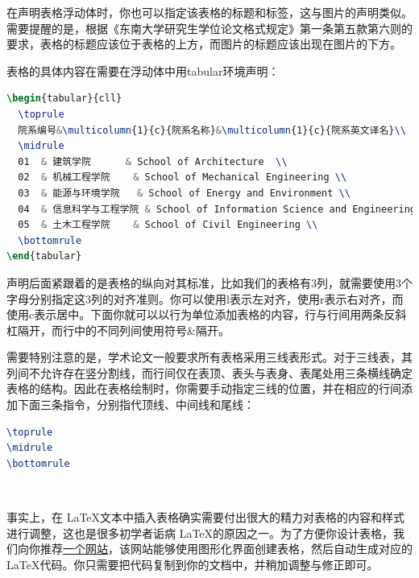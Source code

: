 \noindent 在声明表格浮动体时，你也可以指定该表格的标题和标签，这与图片的声明类似。需要提醒的是，根据《东南大学研究生学位论文格式规定》\cite{seugs2015rule}第一条第五款第六则的要求，表格的标题应该位于表格的上方，而图片的标题应该出现在图片的下方。

表格的具体内容在需要在浮动体中用{\codefont tabular}环境声明：

\begin{tcolorbox}
\begin{lstlisting}[language=TeX]
\begin{tabular}{cll}
  \toprule
  院系编号&\multicolumn{1}{c}{院系名称}&\multicolumn{1}{c}{院系英文译名}\\
  \midrule
  01  & 建筑学院      & School of Architecture  \\
  02  & 机械工程学院    & School of Mechanical Engineering \\
  03  & 能源与环境学院   & School of Energy and Environment \\
  04  & 信息科学与工程学院 & School of Information Science and Engineering \\
  05  & 土木工程学院    & School of Civil Engineering \\
  \bottomrule
\end{tabular}
\end{lstlisting}
\end{tcolorbox}

声明后面紧跟着的是表格的纵向对其标准，比如我们的表格有3列，就需要使用3个字母分别指定这3列的对齐准则。你可以使用{\codefont l}表示左对齐，使用{\codefont r}表示右对齐，而使用{\codefont c}表示居中。下面你就可以以行为单位添加表格的内容，行与行间用两条反斜杠隔开，而行中的不同列间使用符号\&隔开。

需要特别注意的是，学术论文一般要求所有表格采用三线表形式。对于三线表，其列间不允许存在竖分割线，而行间仅在表顶、表头与表身、表尾处用三条横线确定表格的结构。因此在表格绘制时，你需要手动指定三线的位置，并在相应的行间添加下面三条指令，分别指代顶线、中间线和尾线：

\begin{tcolorbox}
\begin{lstlisting}[language=TeX]
\toprule
\midrule
\bottomrule
\end{lstlisting}
\end{tcolorbox}

~

事实上，在 \LaTeX 文本中插入表格确实需要付出很大的精力对表格的内容和样式进行调整，这也是很多初学者诟病 \LaTeX 的原因之一。为了方便你设计表格，我们向你推荐\href{http://www.tablesgenerator.com/}{一个网站}，该网站能够使用图形化界面创建表格，然后自动生成对应的 \LaTeX 代码。你只需要把代码复制到你的文档中，并稍加调整与修正即可。

